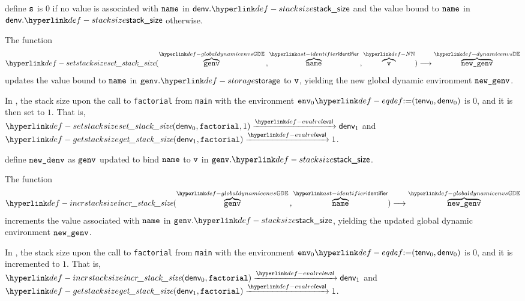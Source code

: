 \ProseParagraph
define $\vs$ is $0$ if no value is associated with $\name$ in $\denv.\stacksize$ and the value bound to
$\name$ in $\denv.\stacksize$ otherwise.

\FormallyParagraph
\begin{mathpar}
\end{mathpar}

\hypertarget{def-setstacksize}{}
The function
\[
\setstacksize(\overname{\genv}{\globaldynamicenvs} \aslsep \overname{\name}{\identifier} \aslsep \overname{\vv}{\N}) \aslto
\overname{\newgenv}{\dynamicenvs}
\]
updates the value bound to $\name$ in $\genv.\storage$ to $\vv$, yielding the new global dynamic environment $\newgenv$.

In , the stack size upon the call to \verb|factorial| from \verb|main|
with the environment $\env_0 \eqdef (\tenv_0, \denv_0)$ is $0$, and it is then set to $1$.
That is, \\
$\setstacksize(\denv_0, \factorial, 1) \evalarrow \denv_1$
and\\
$\getstacksize(\denv_1, \factorial) \evalarrow 1$.

\ProseParagraph
define $\newdenv$ as $\genv$ updated to bind $\name$ to $\vv$ in $\genv.\stacksize$.

\FormallyParagraph
\begin{mathpar}
\end{mathpar}

\hypertarget{def-incrstacksize}{}
The function
\[
\incrstacksize(\overname{\genv}{\globaldynamicenvs} \aslsep \overname{\name}{\identifier}) \aslto
\overname{\newgenv}{\globaldynamicenvs}
\]
increments the value associated with $\name$ in $\genv.\stacksize$, yielding the updated global dynamic environment $\newgenv$.

In , the stack size upon the call to \verb|factorial| from \verb|main|
with the environment $\env_0 \eqdef (\tenv_0, \denv_0)$ is $0$, and it is incremented to $1$.
That is, \\
$\incrstacksize(\denv_0, \factorial) \evalarrow \denv_1$
and\\
$\getstacksize(\denv_1, \factorial) \evalarrow 1$.

